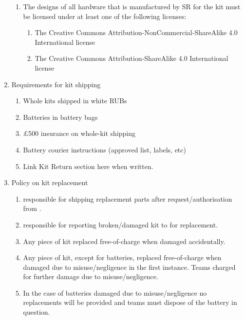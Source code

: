 \begin{enumerate}
\begin{enumerate}
  \item The designs of all hardware that is manufactured by SR for the kit must be licensed under at least one of the following licenses:
    \begin{enumerate}
    \item The Creative Commons Attribution-NonCommercial-ShareAlike 4.0 International license
    \item The Creative Commons Attribution-ShareAlike 4.0 International license
    \end{enumerate}
  \end{enumerate}


\item Requirements for kit shipping
  \begin{enumerate}
    \item{Whole kits shipped in white RUBs}
    \item{Batteries in battery bags}
    \item{\pounds500 insurance on whole-kit shipping}
    \item{Battery courier instructions (approved list, labels, etc)}
    \item{Link Kit Return section here when written.}
  \end{enumerate}
\item Policy on kit replacement
  \begin{enumerate}
    \item{ responsible for shipping replacement parts after request/authorisation from .}
    \item{ responsible for reporting broken/damaged kit to  for replacement.}
    \item{Any piece of kit replaced free-of-charge when damaged accidentally.}
    \item{Any piece of kit, except for batteries, replaced free-of-charge when damaged due to misuse/negligence in the first instance. Teams charged for further damage due to misuse/negligence.}
    \item{In the case of batteries damaged due to misuse/negligence no replacements will be provided and teams must dispose of the battery in question.}
  \end{enumerate}


\end{enumerate}

